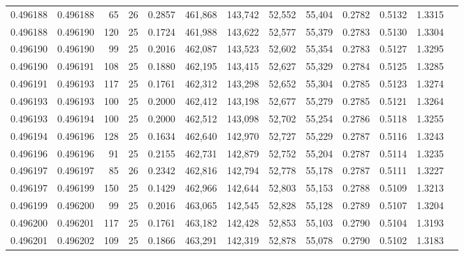 \begin{tabular}{rrrrrrrrrrrrr}
0.496188 & 0.496188 &    65 &  26 &                                     0.2857 & 461,868 & 143,742 &  52,552 &  55,404 & 0.2782 & 0.5132 & 1.3315 \\
0.496188 & 0.496190 &   120 &  25 &                                     0.1724 & 461,988 & 143,622 &  52,577 &  55,379 & 0.2783 & 0.5130 & 1.3304 \\
0.496190 & 0.496190 &    99 &  25 &                                     0.2016 & 462,087 & 143,523 &  52,602 &  55,354 & 0.2783 & 0.5127 & 1.3295 \\
0.496190 & 0.496191 &   108 &  25 &                                     0.1880 & 462,195 & 143,415 &  52,627 &  55,329 & 0.2784 & 0.5125 & 1.3285 \\
0.496191 & 0.496193 &   117 &  25 &                                     0.1761 & 462,312 & 143,298 &  52,652 &  55,304 & 0.2785 & 0.5123 & 1.3274 \\
0.496193 & 0.496193 &   100 &  25 &                                     0.2000 & 462,412 & 143,198 &  52,677 &  55,279 & 0.2785 & 0.5121 & 1.3264 \\
0.496193 & 0.496194 &   100 &  25 &                                     0.2000 & 462,512 & 143,098 &  52,702 &  55,254 & 0.2786 & 0.5118 & 1.3255 \\
0.496194 & 0.496196 &   128 &  25 &                                     0.1634 & 462,640 & 142,970 &  52,727 &  55,229 & 0.2787 & 0.5116 & 1.3243 \\
0.496196 & 0.496196 &    91 &  25 &                                     0.2155 & 462,731 & 142,879 &  52,752 &  55,204 & 0.2787 & 0.5114 & 1.3235 \\
0.496197 & 0.496197 &    85 &  26 &                                     0.2342 & 462,816 & 142,794 &  52,778 &  55,178 & 0.2787 & 0.5111 & 1.3227 \\
0.496197 & 0.496199 &   150 &  25 &                                     0.1429 & 462,966 & 142,644 &  52,803 &  55,153 & 0.2788 & 0.5109 & 1.3213 \\
0.496199 & 0.496200 &    99 &  25 &                                     0.2016 & 463,065 & 142,545 &  52,828 &  55,128 & 0.2789 & 0.5107 & 1.3204 \\
0.496200 & 0.496201 &   117 &  25 &                                     0.1761 & 463,182 & 142,428 &  52,853 &  55,103 & 0.2790 & 0.5104 & 1.3193 \\
0.496201 & 0.496202 &   109 &  25 &                                     0.1866 & 463,291 & 142,319 &  52,878 &  55,078 & 0.2790 & 0.5102 & 1.3183 \\

\end{tabular}
